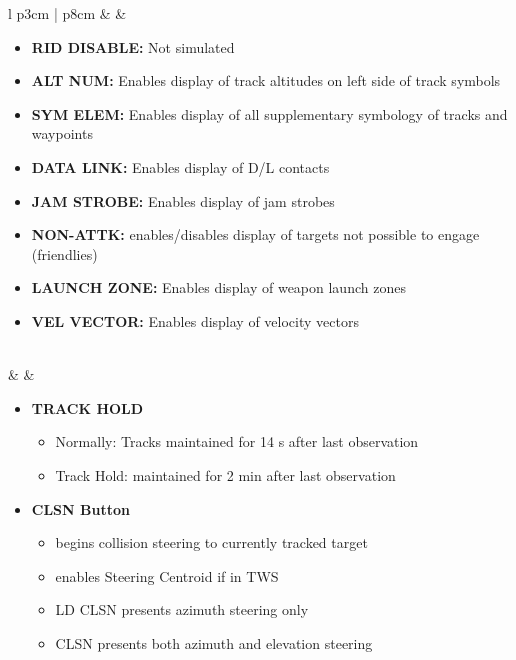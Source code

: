 \documentclass[8pt,usenames,dvipsnames,twoside]{article}
\begin{document}
\begin{center}
\begin{longtable}{l p{3cm} | p{8cm}}
			\midrule
			\textbullet &    &
			\begin{minipage}[t]{\linewidth}
				\vspace{-7pt}
				\begin{itemize}
					\item \textbf{RID DISABLE:} Not simulated
					\item \textbf{ALT NUM:} Enables display of track altitudes on left side of track symbols
					\item \textbf{SYM ELEM:} Enables display of all supplementary symbology of tracks and waypoints
					\item \textbf{DATA LINK:} Enables display of D/L contacts
					\item \textbf{JAM STROBE:} Enables display of jam strobes
					\item \textbf{NON-ATTK:} enables/disables display of targets not possible to engage (friendlies)
					\item \textbf{LAUNCH ZONE:} Enables display of weapon launch zones
					\item \textbf{VEL VECTOR:} Enables display of velocity vectors
				\end{itemize}
			\end{minipage} \\
			\midrule
			\textbullet &    &
			\begin{minipage}[t]{\linewidth}
				\vspace{-7pt}
				\begin{itemize}
					\item \textbf{TRACK HOLD}
					\begin{itemize}
						\item Normally: Tracks maintained for 14 s after last observation
						\item Track Hold: maintained for 2 min after last observation
					\end{itemize}
					\item \textbf{CLSN Button}
					\begin{itemize}
						\item begins collision steering to currently tracked target
						\item enables Steering Centroid if in TWS
						\item LD CLSN presents azimuth steering only
						\item CLSN presents both azimuth and elevation steering
					\end{itemize}

\end{itemize}
\end{minipage}
\end{longtable}
\end{center}
\end{document}
